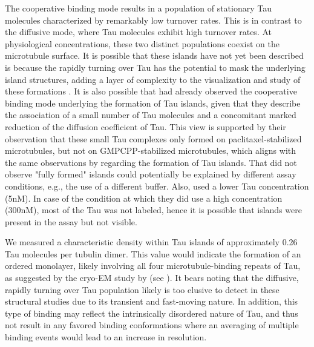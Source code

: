 The cooperative binding mode results in a population of stationary Tau molecules characterized by remarkably low turnover rates. This is in contrast to the diffusive mode, where Tau molecules exhibit high turnover rates. At physiological concentrations, these two distinct populations coexist on the microtubule surface. It is possible that these islands have not yet been described is because the rapidly turning over Tau has the potential to mask the underlying island structures, adding a layer of complexity to the visualization and study of these formations . It is also possible that \cite{Mcvicker2014} had already observed the cooperative binding mode underlying the formation of Tau islands, given that they describe the association of a small number of Tau molecules and a concomitant marked reduction of the diffusion coefficient of Tau. This view is supported by their observation that these small Tau complexes only formed on paclitaxel-stabilized microtubules, but not on GMPCPP-stabilized microtubules, which aligns with the same observations by \cite{tan2019microtubules} regarding the formation of Tau islands. That \cite{Mcvicker2014} did not observe "fully formed" islands could potentially be explained by different assay conditions, e.g., the use of a different buffer. Also, \cite{Mcvicker2014} used a lower Tau concentration (5nM). In case of the condition at which they did use a high concentration (300nM), most of the Tau was not labeled, hence it is possible that islands were present in the assay but not visible.\par

We measured a characteristic density within Tau islands of approximately 0.26 Tau molecules per tubulin dimer. This value would indicate the formation of an ordered monolayer, likely involving all four microtubule-binding repeats of Tau, as suggested by the cryo-EM study by \cite{Kellogg2018} (see ). It bears noting that the diffusive, rapidly turning over Tau population likely is too elusive to detect in these structural studies due to its transient and fast-moving nature. In addition, this type of binding may reflect the intrinsically disordered nature of Tau, and thus not result in any favored binding conformations where an averaging of multiple binding events would lead to an increase in resolution.\par 

